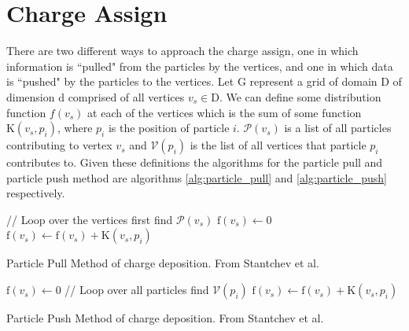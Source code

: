 	\section{Charge Assign}

There are two different ways to approach the charge assign, one in which information is ``pulled" from the particles by the vertices, and one in which data is ``pushed" by the particles to the vertices. Let G represent a grid of domain D of dimension d comprised of all vertices $v_s  \in \mathrm{D}$. We can define some distribution function $f(v_s)$ at each of the vertices which is the sum of some function $\mathrm{K}(v_s,p_i)$, where $p_i$ is the position of particle $i$. 
$\mathcal{P}(v_s)$ is a list of all particles contributing to vertex $v_s$ and $\mathcal{V}(p_i)$ is the list of all vertices that particle $p_i$ contributes to.
Given these definitions the algorithms for the particle pull and particle push method are algorithms \ref{alg:particle_pull} and \ref{alg:particle_push} respectively. 

\begin{algorithm}
	\begin{algorithmic}
		\STATE // Loop over the vertices first
			\STATE find $\mathcal{P}(v_s)$
			\STATE $\mathrm{f}(v_s) \leftarrow 0$
			\STATE $\mathrm{f}(v_s) \leftarrow \mathrm{f}(v_s) + \mathrm{K}(v_s,p_i)$
			\ENDFOR
		\ENDFOR
	\end{algorithmic}
	\caption[Particle Pull Method of charge deposition.]{Particle Pull Method of charge deposition. From Stantchev et al. \cite{Stantchev2008}}
	\label{alg:particle_pull}
\end{algorithm}

\begin{algorithm}
	\begin{algorithmic}
		\FORALL{$\mathrm{vertex} \: v_s \in G$}
			\STATE $\mathrm{f}(v_s) \leftarrow 0$
		\ENDFOR
		\STATE // Loop over all particles
		\FORALL{$\mathrm{particle} \: p_i \in \mathrm{D}$}
			\STATE find $\mathcal{V}(p_i)$
			\FORALL{$v_s \in \mathcal{V}(p_i)$}
				\STATE $\mathrm{f}(v_s) \leftarrow \mathrm{f}(v_s) + \mathrm{K}(v_s,p_i)$
			\ENDFOR
		\ENDFOR
	\end{algorithmic}
	\caption[Particle Push Method of charge deposition.]{Particle Push Method of charge deposition. From Stantchev et al. \cite{Stantchev2008}}
	\label{alg:particle_push}
\end{algorithm}

